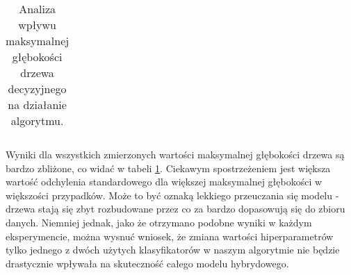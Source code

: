 \documentclass[
    left=2.5cm,         %
    right=2.5cm,        %
    top=2.5cm,          %
    bottom=3cm,         %
    bindingoffset=6mm,  %
    nohyphenation=false %
]{eiti/eiti-report}
\begin{document}
\begin{table}[h]
\begin{tabular}{ |p{2cm}||p{3cm}|p{2cm}|p{2cm}|p{2cm}|p{2cm}|  }
    \hline
\end{tabular}
\caption{Analiza wpływu maksymalnej głębokości drzewa decyzyjnego na działanie algorytmu.}
\label{tab:dpth_table}
\end{table}

Wyniki dla wszystkich zmierzonych wartości maksymalnej głębokości drzewa są bardzo zbliżone, co widać w tabeli \ref{tab:dpth_table}. Ciekawym spostrzeżeniem jest większa wartość odchylenia standardowego dla większej maksymalnej głębokości w większości przypadków. Może to być oznaką lekkiego przeuczania się modelu - drzewa stają się zbyt rozbudowane przez co za bardzo dopasowują się do zbioru danych. Niemniej jednak, jako że otrzymano podobne wyniki w każdym eksperymencie, można wysnuć wniosek, że zmiana wartości hiperparametrów tylko jednego z dwóch użytych klasyfikatorów w naszym algorytmie nie będzie drastycznie wpływała na skuteczność całego modelu hybrydowego.
\end{document}
